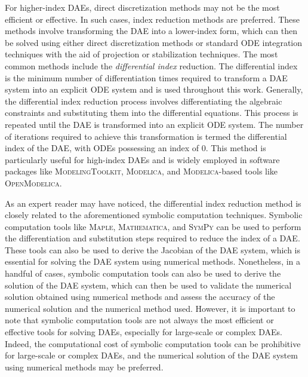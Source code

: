 For higher-index \acp{DAE}, direct discretization methods may not be the most efficient or effective. In such cases, index reduction methods are preferred. These methods involve transforming the \ac{DAE} into a lower-index form, which can then be solved using either direct discretization methods or standard \ac{ODE} integration techniques with the aid of projection or stabilization techniques. The most common methods include the \emph{differential index} reduction. The differential index~\cite{campbell1995index, campbell1995highindex} is the minimum number of differentiation times required to transform a \ac{DAE} system into an explicit \ac{ODE} system and is used throughout this work. Generally, the differential index reduction process involves differentiating the algebraic constraints and substituting them into the differential equations. This process is repeated until the \ac{DAE} is transformed into an explicit \ac{ODE} system. The number of iterations required to achieve this transformation is termed the differential index of the \ac{DAE}, with \acp{ODE} possessing an index of 0. This method is particularly useful for high-index \acp{DAE} and is widely employed in software packages like \textsc{ModelingToolkit}, \textsc{Modelica}, and \textsc{Modelica}-based tools like \textsc{OpenModelica}.

As an expert reader may have noticed, the differential index reduction method is closely related to the aforementioned symbolic computation techniques. Symbolic computation tools like \textsc{Maple}, \textsc{Mathematica}, and \textsc{SymPy} can be used to perform the differentiation and substitution steps required to reduce the index of a \ac{DAE}. These tools can also be used to derive the Jacobian of the \ac{DAE} system, which is essential for solving the \ac{DAE} system using numerical methods. Nonetheless, in a handful of cases, symbolic computation tools can also be used to derive the solution of the \ac{DAE} system, which can then be used to validate the numerical solution obtained using numerical methods and assess the accuracy of the numerical solution and the numerical method used. However, it is important to note that symbolic computation tools are not always the most efficient or effective tools for solving \acp{DAE}, especially for large-scale or complex \acp{DAE}. Indeed, the computational cost of symbolic computation tools can be prohibitive for large-scale or complex \acp{DAE}, and the numerical solution of the \ac{DAE} system using numerical methods may be preferred.

